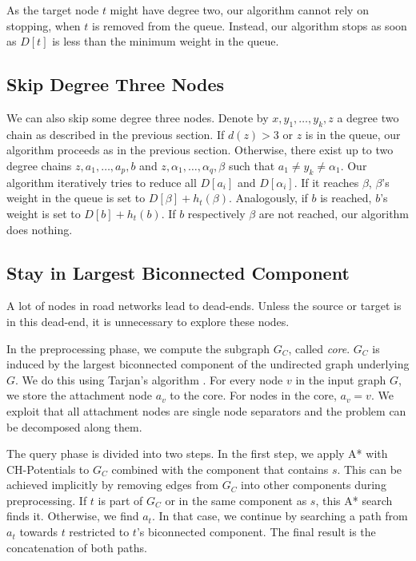 \documentclass[a4paper,UKenglish,cleveref, autoref, thm-restate]{lipics-v2021}
\begin{document}
As the target node $t$ might have degree two, our algorithm cannot rely on stopping, when $t$ is removed from the queue.
Instead, our algorithm stops as soon as $D[t]$ is less than the minimum weight in the queue.

\subsection{Skip Degree Three Nodes}

We can also skip some degree three nodes.
Denote by $x,y_1,\ldots, y_k, z$ a degree two chain as described in the previous section.
If $d(z) > 3$ or $z$ is in the queue, our algorithm proceeds as in the previous section.
Otherwise, there exist up to two degree chains $z,a_1,\ldots,a_p,b$ and $z,\alpha_1,\ldots,\alpha_q,\beta$ such that $a_1\neq y_k \neq \alpha_1$.
Our algorithm iteratively tries to reduce all $D[a_i]$ and $D[\alpha_i]$.
If it reaches $\beta$, $\beta$'s weight in the queue is set to $D[\beta]+h_t(\beta)$.
Analogously, if $b$ is reached, $b$'s weight is set to $D[b]+h_t(b)$.
If $b$ respectively $\beta$ are not reached, our algorithm does nothing.

\subsection{Stay in Largest Biconnected Component}
\label{sec:largested-biconnected-component}

A lot of nodes in road networks lead to dead-ends.
Unless the source or target is in this dead-end, it is unnecessary to explore these nodes.

In the preprocessing phase, we compute the subgraph $G_C$, called \emph{core}.
$G_C$ is induced by the largest biconnected component of the undirected graph underlying $G$.
We do this using Tarjan's algorithm \cite{t-dfslg2-72}.
For every node $v$ in the input graph $G$, we store the attachment node $a_v$ to the core.
For nodes in the core, $a_v=v$.
We exploit that all attachment nodes are single node separators and the problem can be decomposed along them.

The query phase is divided into two steps.
In the first step, we apply A* with CH-Potentials to $G_C$ combined with the component that contains $s$.
This can be achieved implicitly by removing edges from $G_C$ into other components during preprocessing.
If $t$ is part of $G_C$ or in the same component as $s$, this A* search finds it.
Otherwise, we find $a_t$.
In that case, we continue by searching a path from $a_t$ towards $t$ restricted to $t$'s biconnected component.
The final result is the concatenation of both paths.
\end{document}
